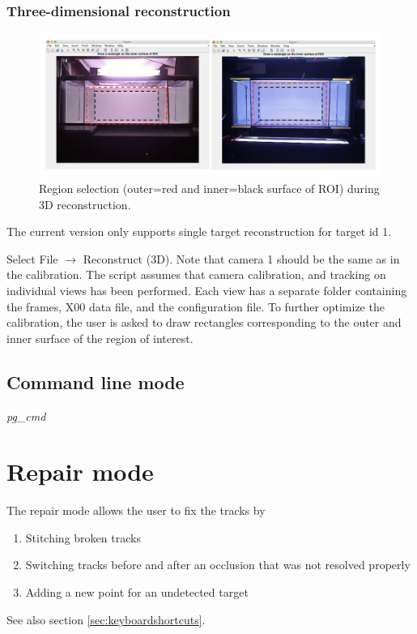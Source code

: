 \documentclass[11pt]{article}
\begin{document}
\subsubsection{Three-dimensional reconstruction}
\begin{figure}[ht]
\centering
\includegraphics[width=.995\linewidth]{roi3d_recon}
\caption{Region selection (outer=red and inner=black surface of ROI) during 3D reconstruction.}
\label{fig:threed_new}
\end{figure}
The current version only supports single target reconstruction for target id 1. 

Select File $\rightarrow$ Reconstruct (3D). Note that camera 1 should be the same as in the calibration. The script assumes that camera calibration, and tracking on individual views has been performed. Each view has a separate folder containing the frames, X00 data file, and the configuration file. To further optimize the calibration, the user is asked to draw rectangles corresponding to the outer and inner surface of the region of interest. 

\subsection{Command line mode}
\emph{pg\_cmd}


\section{Repair mode}
The repair mode allows the user to fix the tracks by
\begin{enumerate}
\item Stitching broken tracks
\item Switching tracks before and after an occlusion that was not resolved properly
\item Adding a new point for an undetected target
\end{enumerate}
See also section \ref{sec:keyboardshortcuts}. 
\end{document}
